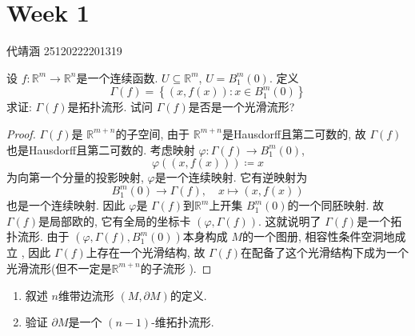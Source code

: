\documentclass[../main.tex]{subfiles}
\begin{document}
\chapter{ Week 1 }


代靖涵 25120222201319


\begin{exercise}{}{}
    设 \(  f:\mathbb{R} ^{m}\to \mathbb{R} ^{n}  \)是一个连续函数.  \( U\subseteq \mathbb{R} ^{m}  \),  \( U= B_{1}^{m}\left( 0 \right)   \). 定义 \[
     \Gamma \left( f \right)= \left\{ \left( x, f\left( x \right)  \right): x \in B_{1}^{m}\left( 0 \right)   \right\} 
    \]求证: \(   \Gamma \left( f \right)   \)是拓扑流形.  试问 \(   \Gamma \left( f \right)   \)是否是一个光滑流形?     
\end{exercise}

\begin{proof}
    \(   \Gamma \left( f \right)   \)是 \(  \mathbb{R} ^{m+ n}  \)的子空间, 由于 \(  \mathbb{R} ^{m+ n}  \)是Hausdorff且第二可数的, 故 \(   \Gamma \left( f \right)   \)也是Hausdorff且第二可数的.    考虑映射 \(   \varphi : \Gamma \left( f \right)\to B_{1}^{m}\left( 0 \right)    \), \[
     \varphi \left( \left( x,f\left( x \right)  \right)  \right)\coloneqq x 
    \] 为向第一个分量的投影映射,  \(   \varphi   \)是一个连续映射. 它有逆映射为 \[
 B_{1}^{m}\left( 0 \right)\to  \Gamma \left( f \right),\quad      x\mapsto  \left( x,f\left( x \right)  \right) 
    \] 也是一个连续映射. 因此 \(   \varphi   \)是 \(   \Gamma \left( f \right)   \)到\(  \mathbb{R} ^{m}  \)上开集 \(  B_{1}^{m}\left( 0 \right)   \)的一个同胚映射. 故 \(   \Gamma \left( f \right)   \)是局部欧的, 它有全局的坐标卡 \(  \left(  \varphi ,  \Gamma \left( f \right)  \right)   \).  这就说明了 \(   \Gamma \left( f \right)   \)是一个拓扑流形.  由于 \(  \left(  \varphi ,  \Gamma \left( f \right), B_{1}^{m}\left( 0 \right)   \right) \)本身构成 \(  M  \)的一个图册, 相容性条件空洞地成立 ,  因此 \(   \Gamma \left( f \right)   \)上存在一个光滑结构, 故 \(   \Gamma \left( f \right)   \)在配备了这个光滑结构下成为一个光滑流形(但不一定是\(  \mathbb{R} ^{m+ n}  \)的子流形 ).   
\end{proof}

\begin{exercise}{}{}
    \begin{enumerate}
        \item 叙述 \(  n  \)维带边流形 \(  \left( M,  \partial M \right)   \)的定义.
        \item 验证 \(   \partial M  \)是一个 \(  \left( n-1 \right)   \)-维拓扑流形.    
    \end{enumerate}
    
\end{exercise}
\end{document}

